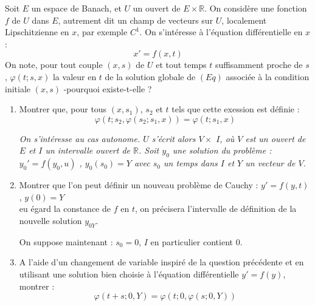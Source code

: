 
\begin{exer}%
Soit $E$ un espace de Banach, et $U$ un ouvert de $E \times \mathbb{R}$. %
On considère une fonction $f$ de $U$ dans $E$, autrement dit un champ de vecteurs sur $U$, localement Lipschitzienne en $x$, par exemple $C^1$. %
On s'intéresse à l'équation différentielle en $x$ : \[x' = f(x,t)\]
On note, pour tout couple $(x,s)$ de $U$ et tout temps $t$ suffisamment proche de $s$, $\varphi(t;s,x)$ la valeur en $t$ de la solution globale de $(Eq)$ associée à la condition initiale $(x,s)$ -pourquoi existe-t-elle ?\\
\ligneinter
\begin{enumerate}
\item Montrer que, pour tous $(x,s_1)$, $s_2$ et $t$ tels que cette exession est définie : \[\varphi(t;s_2,\varphi(s_2;s_1,x)) = \varphi(t;s_1,x)\]
\begin{center}
\begin{minipage}{16cm}
\textit{
On s'intéresse au cas autonome. %
$U$ s'écrit alors $V \times$ $I$, où $V$ est un ouvert de $E$ et $I$ un intervalle ouvert de $\mathbb{R}$. %
Soit $y_0$ une solution du problème : $y_0' = f(y_0,u)$ , $y_0(s_0) = Y$ avec $s_0$ un temps dans $I$ et $Y$ un vecteur de $V$.
}
\end{minipage}
\end{center}
\item Montrer que l'on peut définir un nouveau problème de Cauchy : $y' = f(y,t)$, $y(0) = Y$\\
eu égard la constance de $f$ en $t$, on précisera l'intervalle de définition de la nouvelle solution $y_{0 Y}$.

\smallskip
On suppose maintenant : $s_0 = 0$, $I$ en particulier contient $0$.
\item A l'aide d'un changement de variable inspiré de la question précédente %
et en utilisant une solution bien choisie à l'équation différentielle $y' = f(y)$, montrer :
\[\varphi(t+s;0,Y) = \varphi(t;0,\varphi(s;0,Y))\]
\end{enumerate}
\end{exer}

